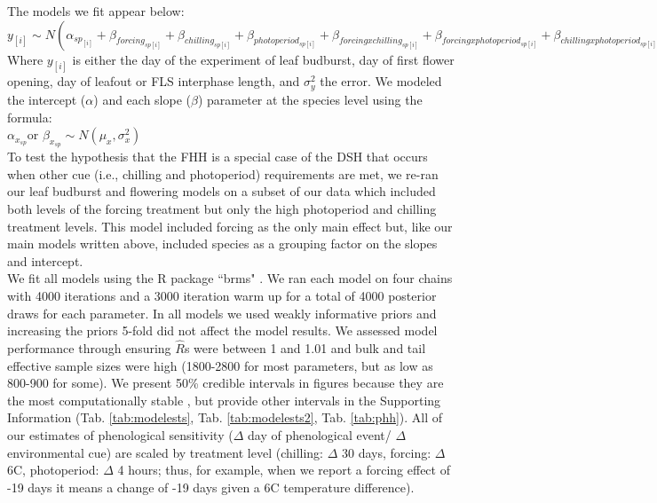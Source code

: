 \documentclass[12pt]{article}\usepackage[]{graphicx}\usepackage[]{color}
\begin{document}
The models we fit appear below:\\

$y_{[i]} \sim N(\alpha_{sp_{[i]}}+\beta_{forcing_{sp[i]}}+\beta_{chilling_{sp[i]}}+\beta_{photoperiod_{sp[i]}}+\beta_{forcing x chilling_{sp[i]}}+\beta_{forcing x photoperiod_{sp[i]}}+\beta_{chilling x photoperiod_{sp[i]}}, \sigma_y^2)$\\

Where $y_{[i]}$ is either the day of the experiment of leaf budburst, day of first flower opening, day of leafout or FLS interphase length, and $\sigma_y^2$ the error.  We modeled the intercept ($\alpha$) and each slope ($\beta$) parameter at the species level using the formula:\\

$\alpha_{x_{sp}} $or $\beta_{x_{sp}} \sim N(\mu_x,\sigma^2_x)$\\

\noindent To test the hypothesis that the FHH is a special case of the DSH that occurs when other cue (i.e., chilling and photoperiod) requirements are met, we re-ran our leaf budburst and flowering models on a subset of our data which included both levels of the forcing treatment but only the high photoperiod and chilling treatment levels. This model included forcing as the only main effect but, like our main models written above, included species as a grouping factor on the slopes and intercept.\\ 

\noindent We fit all models using the R package ``brms" \citep{Burkner2018}. We ran each model on four chains with 4000 iterations and a 3000 iteration warm up for a total of 4000 posterior draws for each parameter. In all models we used weakly informative priors and increasing the priors 5-fold did not affect the model results. We assessed  model performance through ensuring $\hat{R}$s were between 1 and 1.01 and bulk and tail effective sample sizes were high (1800-2800 for most parameters, but as low as  800-900 for some). We present 50\% credible intervals in figures because they are the most computationally stable \citep{Gelman2013}, but provide other intervals in the Supporting Information (Tab. \ref{tab:modelests}, Tab. \ref{tab:modelests2}, Tab. \ref{tab:phh}). All of our estimates of phenological sensitivity ($\Delta$ day of phenological event/ $\Delta$ environmental cue) are scaled by treatment level (chilling: $\Delta$ 30 days, forcing: $\Delta$ 6\degree C, photoperiod: $\Delta$ 4 hours; thus, for example, when we report a forcing effect of -19 days it means a change of -19 days given a 6\degree C temperature difference).\\
\end{document}
